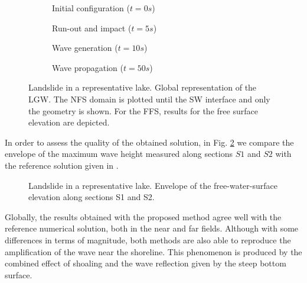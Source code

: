 \begin{figure} [p]
    \centering
    \begin{subfigure}{\textwidth}
        \centering
        \caption{Initial configuration ($t=0s$)}
    \end{subfigure}
    \vspace{5pt}

    \begin{subfigure}{\textwidth}
        \centering
        \caption{Run-out and impact ($t=5s$)}
    \end{subfigure}
    \vspace{5pt}

    \begin{subfigure}{\textwidth}
        \centering
        \caption{Wave generation ($t=10s$)}
    \end{subfigure}
    \vspace{5pt}

    \begin{subfigure}{\textwidth}
        \caption{Wave propagation ($t=50s$)}
        \hfill
    \end{subfigure}
    \caption{Landslide in a representative lake. Global representation of the LGW. The NFS domain is plotted until the SW interface and only the geometry is shown. For the FFS, results for the free surface elevation are depicted.}
    \label{ex3_postprocess}
\end{figure}


In order to assess the quality of the obtained solution, in Fig. \ref{ex3_max_wave_height} we compare the envelope of the maximum wave height measured along sections $S1$ and $S2$ with the reference solution given in \cite{app112411614}.

\begin{figure} [ht]
    \centering
    \caption{Landslide in a representative lake. Envelope of the free-water-surface elevation along sections S1 and S2.}
    \label{ex3_max_wave_height}
\end{figure}

Globally, the results obtained with the proposed method agree well with the reference numerical solution, both in the near and far fields. Although with some differences in terms of magnitude, both methods are also able to reproduce the amplification of the wave near the shoreline. This phenomenon is produced by the combined effect of shoaling and the wave reflection given by the steep bottom surface. 

